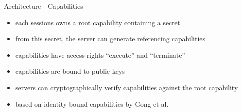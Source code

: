 \documentclass[a4paper]{beamer}
\begin{document}
\begin{frame}{Architecture - Capabilities}
    \begin{itemize}
        \item each sessions owns a root capability containing a secret
        \item from this secret, the server can generate referencing capabilities
        \item capabilities have access rights ``execute'' and ``terminate''
        \item capabilities are bound to public keys
        \item servers can cryptographically verify capabilities against the root capability
        \item based on identity-bound capabilities by Gong et al. \cite{gong1989secure}
    \end{itemize}
\end{frame}
\end{document}
